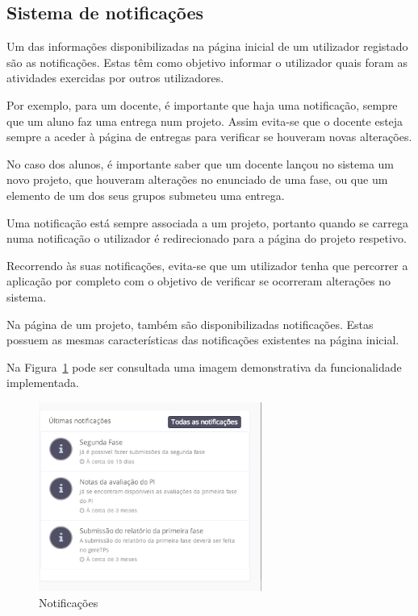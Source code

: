 \subsection{Sistema de notificações}

Um das informações disponibilizadas na página inicial de um utilizador registado são as notificações. Estas têm como objetivo informar o utilizador quais foram as atividades exercidas por outros utilizadores.

Por exemplo, para um docente, é importante que haja uma notificação, sempre que um aluno faz uma entrega num projeto. Assim evita-se que o docente esteja sempre a aceder à página de entregas para verificar se houveram novas alterações.

No caso dos alunos, é importante saber que um docente lançou no sistema um novo projeto, que houveram alterações no enunciado de uma fase, ou que um elemento de um dos seus grupos submeteu uma entrega.

Uma notificação está sempre associada a um projeto, portanto quando se carrega numa notificação o utilizador é redirecionado para a página do projeto respetivo.

Recorrendo às suas notificações, evita-se que um utilizador tenha que percorrer a aplicação por completo com o objetivo de verificar se ocorreram alterações no sistema.

Na página de um projeto, também são disponibilizadas notificações. Estas possuem as mesmas características das notificações existentes na página inicial.

Na Figura~\ref{fig:notifications} pode ser consultada uma imagem demonstrativa da funcionalidade implementada.

\begin{figure}[H]
  \centering
  \includegraphics[width=0.65\textwidth,center]{images/implementacao/alunos/notifications}
  \caption{Notificações}
  \label{fig:notifications}
\end{figure}
